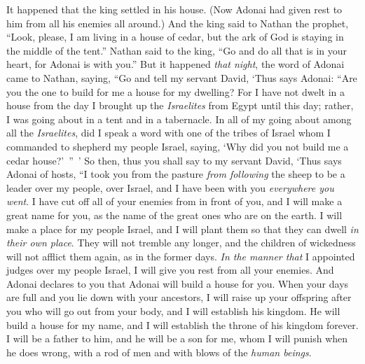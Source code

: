 \begin{biblechapter} %
 It happened that the king settled in his house. (Now Adonai had given rest to him from all his enemies all around.)
\verse And the king said to Nathan the prophet, “Look, please, I am living in a house of cedar, but the ark of God is staying in the middle of the tent.”
\verse Nathan said to the king, “Go and do all that is in your heart, for Adonai is with you.”
\verse But it happened \textit{that night}, the word of Adonai came to Nathan, saying,
\verse “Go and tell my servant David, ‘Thus says Adonai: “Are you the one to build for me a house for my dwelling?
\verse For I have not dwelt in a house from the day I brought up the \textit{Israelites} from Egypt until this day; rather, I was going about in a tent and in a tabernacle.
\verse In all of my going about among all the \textit{Israelites}, did I speak a word with one of the tribes of Israel whom I commanded to shepherd my people Israel, saying, ‘Why did you not build me a cedar house?’ ” ’
\verse So then, thus you shall say to my servant David, ‘Thus says Adonai of hosts, “I took you from the pasture \textit{from following} the sheep to be a leader over my people, over Israel,
\verse and I have been with you \textit{everywhere you went}. I have cut off all of your enemies from in front of you, and I will make a great name for you, as the name of the great ones who are on the earth.
\verse I will make a place for my people Israel, and I will plant them so that they can dwell \textit{in their own place}. They will not tremble any longer, and the children of wickedness will not afflict them again, as in the former days.
\verse \textit{In the manner that} I appointed judges over my people Israel, I will give you rest from all your enemies. And Adonai declares to you that Adonai will build a house for you.
\verse When your days are full and you lie down with your ancestors, I will raise up your offspring after you who will go out from your body, and I will establish his kingdom.
\verse He will build a house for my name, and I will establish the throne of his kingdom forever.
\verse I will be a father to him, and he will be a son for me, whom I will punish when he does wrong, with a rod of men and with blows of the \textit{human beings}.

\end{biblechapter}
